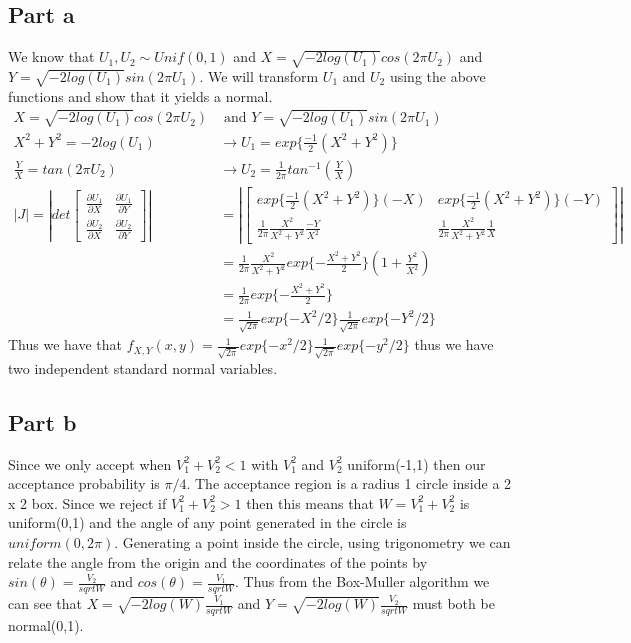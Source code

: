 \documentclass{article}\usepackage[]{graphicx}\usepackage[]{color}
\begin{document}
\subsection*{Part a}
We know that $U_1, U_2 \sim Unif(0,1)$ and $X = \sqrt{-2log(U_1)}cos(2\pi U_2)$ and $Y = \sqrt{-2log(U_1)}sin(2\pi U_1)$.  We will transform $U_1$ and $U_2$ using the above functions and show that it yields a normal.\\
\begin{align*}
X = \sqrt{-2log(U_1)}cos(2\pi U_2) &\text{ and } Y = \sqrt{-2log(U_1)}sin(2\pi U_1) \\
X^2 + Y^2 = -2log(U_1) &\longrightarrow U_1 = exp\{\frac{-1}{2} (X^2 + Y^2) \} \\
\frac{Y}{X} = tan(2\pi U_2) &\longrightarrow U_2 = \frac{1}{2\pi} tan^{-1}(\frac{Y}{X}) \\
|J| = |det \begin{bmatrix}\frac{\partial U_1}{\partial X} & \frac{\partial U_1}{\partial Y} \\ 
                          \frac{\partial U_2}{\partial X} & \frac{\partial U_2}{\partial Y} \end{bmatrix}|
   &= |\begin{bmatrix} exp\{ \frac{-1}{2}(X^2 + Y^2) \} (-X) & exp\{ \frac{-1}{2}(X^2 + Y^2) \} (-Y) \\ 
                       \frac{1}{2\pi} \frac{X^2}{X^2 + Y^2} \frac{-Y}{X^2} & 
                       \frac{1}{2\pi} \frac{X^2}{X^2 + Y^2} \frac{1}{X}\end{bmatrix}| \\
                      &= \frac{1}{2\pi} \frac{X^2}{X^2 + Y^2} exp\{-\frac{X^2 + Y^2}{2} \} (1 + \frac{Y^2}{X^2}) \\
   &= \frac{1}{2\pi} exp\{-\frac{X^2 + Y^2}{2} \} \\
   &= \frac{1}{\sqrt{2\pi}}exp\{-X^2 /2 \} \frac{1}{\sqrt{2\pi}}exp\{-Y^2 / 2 \} 
\end{align*}
Thus we have that $f_{X,Y}(x,y) = \frac{1}{\sqrt{2\pi}}exp\{-x^2 /2 \} \frac{1}{\sqrt{2\pi}}exp\{-y^2 / 2 \}$ thus we have two independent standard normal variables.

\subsection*{Part b}
Since we only accept when $V_1^2 + V_2^2 < 1$ with $V_1^2$ and $V_2^2$ uniform(-1,1) then our acceptance probability is $\pi/4$.  The acceptance region is a radius 1 circle inside a 2 x 2 box.  Since we reject if $V_1^2 + V_2^2 > 1$ then this means that $W = V_1^2 + V_2^2$ is uniform(0,1) and the angle of any point generated in the circle is $uniform(0, 2\pi)$.  Generating a point inside the circle, using trigonometry we can relate the angle from the origin and the coordinates of the points by $sin(\theta) = \frac{V_2}{sqrt{W}}$ and $cos(\theta) = \frac{V_1}{sqrt{W}}$.  Thus from the Box-Muller algorithm we can see that $X = \sqrt{-2log(W)}\frac{V_1}{sqrt{W}}$ and $Y = \sqrt{-2log(W)}\frac{V_2}{sqrt{W}}$ must both be normal(0,1).
\end{document}
